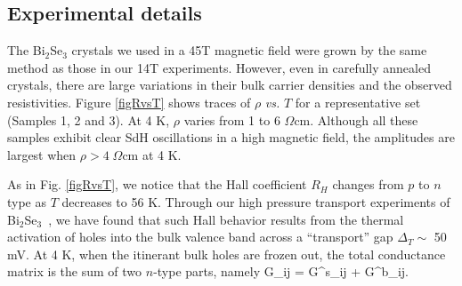 \subsection{Experimental details}
%


The Bi$_2$Se$_3$ crystals we used in a 45T magnetic field were grown by the same method as those in our 14T experiments. However, even in carefully annealed crystals, there are large variations in their bulk carrier densities and the observed resistivities. Figure \ref{figRvsT} shows traces of $\rho$ \emph{vs.} $T$ for a representative set (Samples 1, 2 and 3). At 4 K, $\rho$ varies from 1 to 6 $\Omega$cm.
Although all these samples exhibit clear SdH oscillations in a high magnetic field, the amplitudes are largest when $\rho > 4\;\Omega$cm at 4 K. 


As in Fig. \ref{figRvsT}, we notice that the Hall coefficient $R_H$ changes from $p$ to $n$ type as $T$ decreases to 56 K. Through our high pressure transport experiments of Bi$_2$Se$_3$~\cite{Luo}, we have found that such Hall behavior results from the thermal activation 
of holes into the bulk valence band across a ``transport'' gap $\Delta_T\sim$ 50 mV. At 4 K, when the itinerant bulk holes are frozen out, the total conductance matrix is the sum of two $n$-type parts, namely
\be
G_{ij} = G^s_{ij} + G^b_{ij}.
\label{eq:G}
\ee

